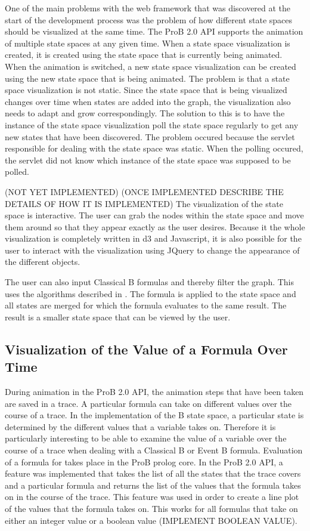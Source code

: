 One of the main problems with the web framework that was discovered at the start of the development process was the problem of how different state spaces should be visualized at the same time. The ProB 2.0 API supports the animation of multiple state spaces at any given time. When a state space visualization is created, it is created using the state space that is currently being animated. When the animation is switched, a new state space visualization can be created using the new state space that is being animated. The problem is that a state space visualization is not static. Since the state space that is being visualized changes over time when states are added into the graph, the visualization also needs to adapt and grow correspondingly. The solution to this is to have the instance of the state space visualization poll the state space regularly to get any new states that have been discovered. The problem occured because the servlet responsible for dealing with the state space was static. When the polling occured, the servlet did not know which instance of the state space was supposed to be polled.


(NOT YET IMPLEMENTED)
(ONCE IMPLEMENTED DESCRIBE THE DETAILS OF HOW IT IS IMPLEMENTED)
The visualization of the state space is interactive. The user can grab the nodes within the state space and move them around so that they appear exactly as the user desires. Because it the whole visualization is completely written in d3 and Javascript, it is also possible for the user to interact with the visualization using JQuery to change the appearance of the different objects. 

The user can also input Classical B formulas and thereby filter the graph. This uses the algorithms described in \cite{LeTu05_8}. The formula is applied to the state space and all states are merged for which the formula evaluates to the same result. The result is a smaller state space that can be viewed by the user.

\subsection{Visualization of the Value of a Formula Over Time}

During animation in the ProB 2.0 API, the animation steps that have been taken are saved in a trace. A particular formula can take on different values over the course of a trace. In the implementation of the B state space, a particular state is determined by the different values that a variable takes on. Therefore it is particularly interesting to be able to examine the value of a variable over the course of a trace when dealing with a Classical B or Event B formula. 
Evaluation of a formula for takes place in the ProB prolog core. In the ProB 2.0 API, a feature was implemented that takes the list of all the states that the trace covers and a particular formula and returns the list of the values that the formula takes on in the course of the trace. This feature was used in order to create a line plot of the values that the formula takes on. This works for all formulas that take on either an integer value or a boolean value (IMPLEMENT BOOLEAN VALUE).

